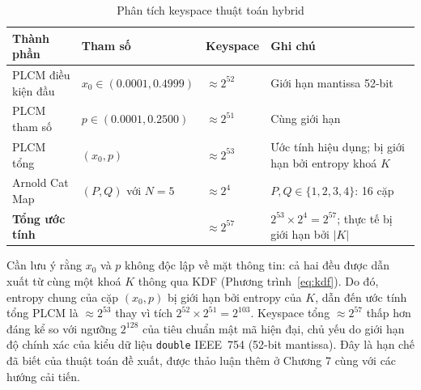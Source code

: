 \begin{table}[ht]
\centering
\caption{Phân tích keyspace thuật toán hybrid}
\label{tab:keyspace}
\begin{tabular}{|l|l|l|l|}
\hline
\textbf{Thành phần} & \textbf{Tham số} & \textbf{Keyspace} & \textbf{Ghi chú} \\
\hline
PLCM điều kiện đầu & $x_0 \in (0.0001, 0.4999)$ & $\approx 2^{52}$ & Giới hạn mantissa 52-bit \\
\hline
PLCM tham số & $p \in (0.0001, 0.2500)$ & $\approx 2^{51}$ & Cùng giới hạn \\
\hline
PLCM tổng & $(x_0, p)$ & $\approx 2^{53}$ & Ước tính hiệu dụng; bị giới hạn bởi entropy khoá $K$ \\
\hline
Arnold Cat Map & $(P, Q)$ với $N=5$ & $\approx 2^{4}$ & $P, Q \in \{1,2,3,4\}$: 16 cặp \\
\hline
\textbf{Tổng ước tính} & & $\approx 2^{57}$ & $2^{53} \times 2^{4} = 2^{57}$; thực tế bị giới hạn bởi $|K|$ \\
\hline
\end{tabular}
\end{table}

Cần lưu ý rằng $x_0$ và $p$ không độc lập về mặt thông tin: cả hai đều được dẫn xuất từ cùng một khoá $K$ thông qua KDF (Phương trình~\ref{eq:kdf}). Do đó, entropy chung của cặp $(x_0, p)$ bị giới hạn bởi entropy của $K$, dẫn đến ước tính tổng PLCM là $\approx 2^{53}$ thay vì tích $2^{52} \times 2^{51} = 2^{103}$. Keyspace tổng $\approx 2^{57}$ thấp hơn đáng kể so với ngưỡng $2^{128}$ của tiêu chuẩn mật mã hiện đại, chủ yếu do giới hạn độ chính xác của kiểu dữ liệu \texttt{double} IEEE~754 (52-bit mantissa). Đây là hạn chế đã biết của thuật toán đề xuất, được thảo luận thêm ở Chương 7 cùng với các hướng cải tiến.

